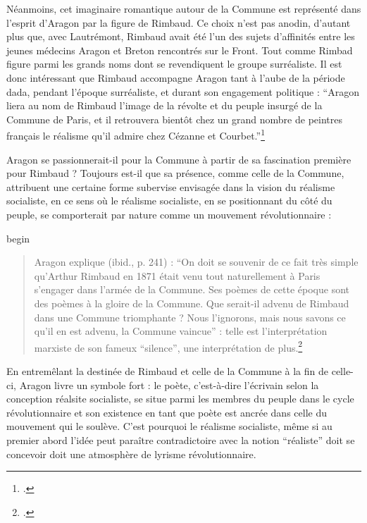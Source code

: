 Néanmoins, cet imaginaire romantique autour de la Commune est représenté dans l'esprit d'Aragon par la figure de Rimbaud. Ce choix n'est pas anodin, d'autant plus que, avec Lautrémont, Rimbaud avait été l'un des sujets d'affinités entre les jeunes médecins Aragon et Breton rencontrés sur le Front. Tout comme Rimbad figure parmi les grands noms dont se revendiquent le groupe surréaliste. Il est donc intéressant que Rimbaud accompagne Aragon tant à l'aube de la période dada, pendant l'époque surréaliste, et durant son engagement politique : \enquote{Aragon liera au nom de Rimbaud l’image de la révolte et du peuple insurgé de la Commune de Paris, et il retrouvera bientôt chez un grand nombre de peintres français le réalisme qu’il admire chez Cézanne et Courbet.}\footcite[p165]{these}

Aragon se passionnerait-il pour la Commune à partir de sa fascination première pour Rimbaud ? Toujours est-il que sa présence, comme celle de la Commune, attribuent une certaine forme subervise envisagée dans la vision du réalisme socialiste, en ce sens où le réalisme socialiste, en se positionnant du côté du peuple, se comporterait par nature comme un mouvement révolutionnaire :

begin\begin{quote}
Aragon explique (ibid., p. 241) : “On doit se souvenir de ce fait très simple qu’Arthur Rimbaud en 1871 était venu tout naturellement à Paris s’engager dans l’armée de la Commune. Ses poèmes de cette époque sont des poèmes à la gloire de la Commune. Que serait-il advenu de Rimbaud dans une Commune triomphante ? Nous l’ignorons, mais nous savons ce qu’il en est advenu, la Commune vaincue” : telle est l’interprétation marxiste de son fameux “silence”, une interprétation de plus.\footcite[p241]{these}	
\end{quote} 

En entremêlant la destinée de Rimbaud et celle de la Commune à la fin de celle-ci, Aragon livre un symbole fort : le poète, c'est-à-dire l'écrivain selon la conception réalsite socialiste, se situe parmi les membres du peuple dans le cycle révolutionnaire et son existence en tant que poète est ancrée dans celle du mouvement qui le soulève. C'est pourquoi le réalisme socialiste, même si au premier abord l'idée peut paraître contradictoire avec la notion \enquote{réaliste} doit se concevoir doit une atmosphère de lyrisme révolutionnaire. 

